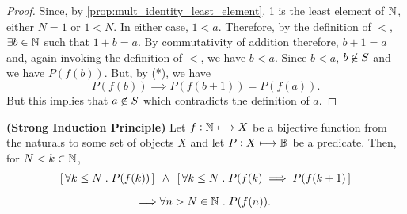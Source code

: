 \documentclass[../MathsNotesBase.tex]{subfiles}
\begin{document}
{\begin{proof}
			Since, by \autoref{prop:mult_identity_least_element}, 1 is the least element of $\mathbb{N}^{}$, either ${ N = 1 }$ or ${ 1 < N }$. In either case, ${ 1 < a }$. Therefore, by the definition of $<$, ${ \exists b \in \mathbb{N}^{} }$ such that ${ 1 + b = a }$. By commutativity of addition therefore, ${ b + 1 = a }$ and, again invoking the definition of $<$, we have ${ b < a }$. Since ${ b < a }$, ${ b \centernot\in S }$ and we have ${ P(f(b)) }$. But, by (*), we have
			\[ P(f(b)) \implies P(f(b+1)) = P(f(a)). \]
			But this implies that ${ a \centernot\in S }$ which contradicts the definition of $a$.
		\end{proof}
		\medskip
		\begin{corollary}\label{coro:strong-induction-principle}
			\textbf{(Strong Induction Principle)} Let ${f: \mathbb{N}^{} \longmapsto X }$ be a bijective function from the naturals to some set of objects $X$ and let ${ P: X \longmapsto \mathbb{B}^{} }$ be a predicate. Then, for ${ N < k \in \mathbb{N}^{} }$,
			\[\begin{aligned}
				[\, \forall k \leq N \logicsep P(f(k)) \,] \;\, &\land \;\, [\, \forall k \leq N \logicsep P(f(k) \implies P(f(k+1) \,] \nn
				\implies &\forall n > N \in \N{} \logicsep P(f(n)).
			\end{aligned}\]
		\end{corollary}
	}




\pagebreak

	
	
\end{document}
